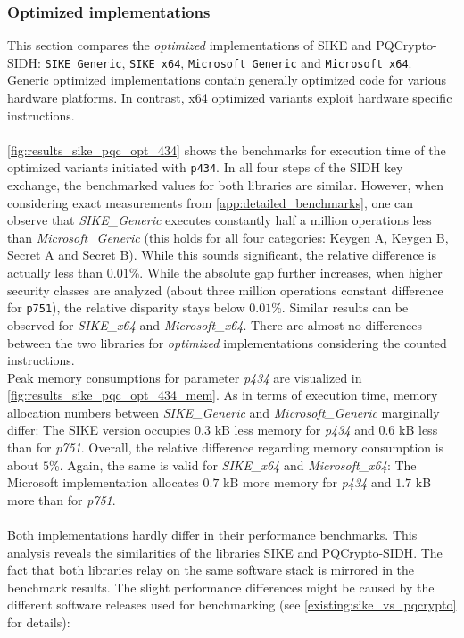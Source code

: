 \subsubsection{Optimized implementations}
This section compares the \textit{optimized} implementations of \gls{SIKE} and \gls{PQCrypto-SIDH}: \texttt{SIKE\_Generic}, \texttt{SIKE\_x64}, \texttt{Microsoft\_Generic} and  \texttt{Microsoft\_x64}.
Generic optimized implementations contain generally optimized code for various hardware platforms. In contrast, x64 optimized variants exploit hardware specific instructions.
\\\\
\autoref{fig:results_sike_pqc_opt_434} shows the benchmarks for execution time of the optimized variants initiated with \texttt{p434}. In all four steps of the \gls{SIDH} key exchange, the benchmarked values for both libraries are similar. However, when considering exact measurements from  \ref{app:detailed_benchmarks}, one can observe that \textit{SIKE\_Generic} executes constantly half a million operations less than \textit{Microsoft\_Generic} (this holds for all four categories: Keygen A, Keygen B, Secret A and Secret B). While this sounds significant, the relative difference is actually less than $0.01$\%. While the absolute gap further increases, when higher security classes are analyzed (about three million operations constant difference for \texttt{p751}), the relative disparity stays below $0.01$\%. Similar results can be observed for \textit{SIKE\_x64} and \textit{Microsoft\_x64}. There are almost no differences between the two libraries for \textit{optimized} implementations considering the counted instructions.
\\
Peak memory consumptions for parameter \textit{p434} are visualized in  \autoref{fig:results_sike_pqc_opt_434_mem}. As in terms of execution time, memory allocation numbers between \textit{SIKE\_Generic} and \textit{Microsoft\_Generic} marginally differ: The \gls{SIKE} version occupies $0.3$ \gls{kB} less memory for \textit{p434} and $0.6$ \gls{kB} less than for \textit{p751}. Overall, the relative difference regarding memory consumption is about $5$\%. Again, the same is valid for \textit{SIKE\_x64} and \textit{Microsoft\_x64}: The Microsoft implementation allocates $0.7$ \gls{kB} more memory for \textit{p434} and $1.7$ \gls{kB} more than for \textit{p751}.
\\\\
Both implementations hardly differ in their performance benchmarks. This analysis reveals the similarities of the libraries \gls{SIKE} and \gls{PQCrypto-SIDH}. The fact that both libraries relay on the same software stack is mirrored in the benchmark results. The slight performance differences might be caused by the different software releases used for benchmarking (see \autoref{existing:sike_vs_pqcrypto} for details):

